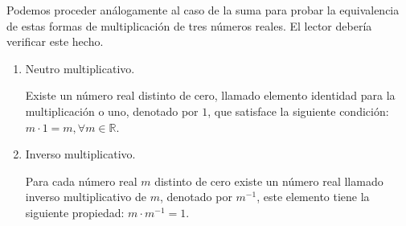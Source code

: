\documentclass[11pt]{article}
\newcommand{\R}{\mathbb{R}}
\begin{document}
Podemos proceder análogamente al caso de la suma para probar la equivalencia de estas formas de multiplicación de tres números reales. El lector debería verificar este hecho.

\begin{enumerate}[label=M\arabic*.]

    \item Neutro multiplicativo.
    
    Existe un número real distinto de cero, llamado elemento identidad para la multiplicación o uno, denotado por $1$, que satisface la siguiente condición: $ m \cdot 1 = m,\forall m \in \R $.

    \item Inverso multiplicativo.
    
    Para cada número real $m$ distinto de cero existe un número real llamado inverso multiplicativo de $m$, denotado por $m^{-1}$, este elemento tiene la siguiente propiedad: $m \cdot m^{-1} = 1$.
\end{enumerate}
\end{document}
